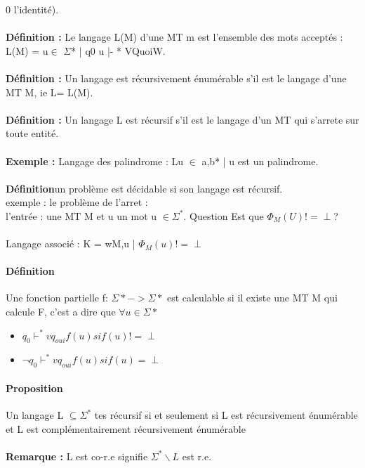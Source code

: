 \documentclass{article}
\begin{document}
0 l'identité).\\\\\textbf{Définition : }Le langage L(M) d'une MT m est l'ensemble des mots acceptés : L(M) = {u$\in$ $\Sigma$* | q0 u |- * VQuoiW}.\\\\\textbf{Définition : } Un langage est récursivement énumérable s'il est le langage d'une MT M, ie L= L(M).\\\\\textbf{Définition : } Un langage L est récursif s'il est le langage d'un MT qui s'arrete sur toute entité.\\\\\textbf{Exemple : } Langage des palindrome : L{u $\in$ {a,b}* | u est un palindrome}.\\\\ \textbf{Définition}un problème est décidable si son langage est récursif.\\exemple : le problème de l'arret :\\ l'entrée : une MT M et u un mot u $\in \Sigma^{*}$. Question Est que $\Phi_{M}(U) != \perp$?\\\\Langage associé : K = {wM,u | $\Phi_{M}(u) != \perp$}
\paragraph{Définition}
Une fonction partielle f: $\Sigma* -> \Sigma*$ est calculable si il existe une MT M qui calcule F, c'est a dire que $\forall u \in \Sigma*$ \begin{itemize}
\item $q_{0} \vdash^{*} vq_{oui}f(u) si f(u) != \perp$
\item $\neg q_{0} \vdash^{*} vq_{oui}f(u) si f(u) = \perp$
\end{itemize}
\paragraph{Proposition}
Un langage L $\subseteq \Sigma^{*}$ tes récursif si et seulement si L est récursivement énumérable et L est complémentairement récursivement énumérable \\\\\textbf{Remarque : }L est co-r.e signifie $\Sigma^{*}\backslash L$ est r.e.
\end{document}

